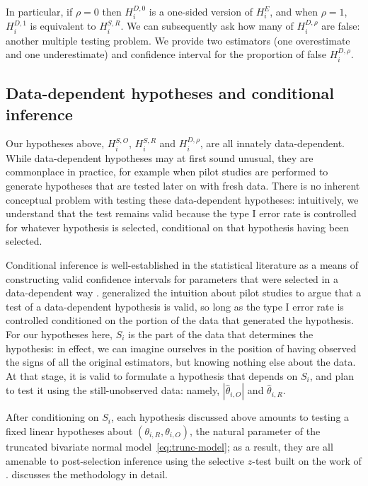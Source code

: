 \documentclass[11pt]{article}
\theoremstyle{definition}
\theoremstyle{custom}
\newcommand{\htheta}{\hat{\theta}}
\begin{document}
  In particular, if $\rho=0$ then $H_i^{D,0}$ is a one-sided version of $H_i^E$, and when $\rho=1$, $H_i^{D,1}$ is equivalent to $H_i^{S,R}$. We can subsequently ask how many of $H_i^{D,\rho}$ are false: another multiple testing problem. We provide two estimators (one overestimate and one underestimate) and confidence interval for the proportion of false $H_i^{D,\rho}$.

\subsection{Data-dependent hypotheses and conditional inference}

  Our hypotheses above, $H_i^{S,O}$, $H_i^{S,R}$ and $H_i^{D,\rho}$, are all innately data-dependent. While data-dependent hypotheses may at first sound unusual, they are commonplace in practice, for example when pilot studies are performed to generate hypotheses that are tested later on with fresh data. There is no inherent conceptual problem with testing these data-dependent hypotheses: intuitively, we understand that the test remains valid because the type I error rate is controlled for whatever hypothesis is selected, conditional on that hypothesis having been selected.

  Conditional inference is well-established in the statistical literature as a means of constructing valid confidence intervals for parameters that were selected in a data-dependent way \citep[e.g.][]{Sampson:2005,Zollner:2007,Weinstein:2013,Yekutieli:2012}. \citet{Fithian:2014ws} generalized the intuition about pilot studies to argue that a test of a data-dependent hypothesis is valid, so long as the type I error rate is controlled conditioned on the portion of the data that generated the hypothesis. For our hypotheses here, $S_i$ is the part of the data that determines the hypothesis: in effect, we can imagine ourselves in the position of having observed the signs of all the original estimators, but knowing nothing else about the data. At that stage, it is valid to formulate a hypothesis that depends on $S_i$, and plan to test it using the still-unobserved data: namely, $|\htheta_{i,O}|$ and $\htheta_{i,R}$.

  After conditioning on $S_i$, each hypothesis discussed above amounts to testing a fixed linear hypotheses about $(\theta_{i,R}, \theta_{i,O})$, the natural parameter of the truncated bivariate normal model~\eqref{eq:trunc-model}; as a result, they are all amenable to post-selection inference using the selective $z$-test built on the work of \citet{Lee:2016fv}.  discusses the methodology in detail.
\end{document}

